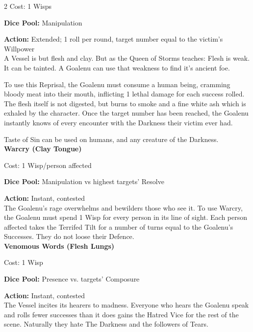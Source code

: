 \begin{multicols}{2}
\noindent Cost: 1 Wisps

\noindent\textbf{Dice Pool:} Manipulation

\noindent\textbf{Action:} Extended; 1 roll per round, target number equal to the victim's Willpower\\

\noindent A Vessel is but flesh and clay. But as the Queen of Storms teaches: Flesh is weak. It can be tainted. A Goalenu can use that weakness to find it's ancient foe. 

To use this Reprisal, the Goalenu must consume a human being, cramming bloody meat into their mouth, inflicting 1 lethal damage for each success rolled. The flesh itself is not digested, but burns to smoke and a fine white ash which is exhaled by the character. Once the target number has been reached, the Goalenu instantly knows of every encounter with the Darkness their victim ever had. 

Taste of Sin can be used on humans, and any creature of the Darkness. \\

\noindent\textbf{Warcry (Clay Tongue)}

\noindent Cost: 1 Wisp/person affected

\noindent\textbf{Dice Pool:} Manipulation vs highest targets' Resolve

\noindent\textbf{Action:} Instant, contested\\

\noindent The Goalenu's rage overwhelms and bewilders those who see it. To use Warcry, the Goalenu must spend 1 Wisp for every person in its line of sight. Each person affected takes the Terrifed Tilt for a number of turns equal to the Goalenu's Successes. They do not loose their Defence. \\

\noindent\textbf{Venomous Words (Flesh Lungs)}

\noindent Cost: 1 Wisp

\noindent\textbf{Dice Pool:} Presence vs. targets' Composure

\noindent\textbf{Action:} Instant, contested\\

\noindent The Vessel incites its hearers to madness. Everyone who hears the Goalenu speak and rolls fewer successes than it does gains the Hatred Vice for the rest of the scene. Naturally they hate The Darkness and the followers of Tears.\\


\end{multicols}
